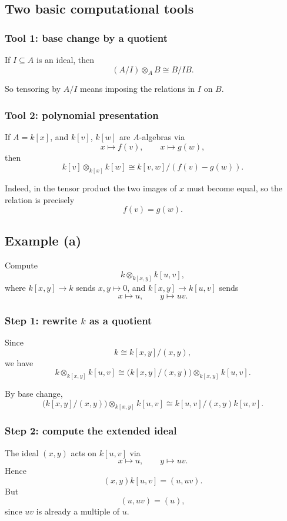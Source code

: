 \documentclass[12pt,a4paper]{article}
\theoremstyle{notespace}
\begin{document}
\subsection{Two basic computational tools}

\subsubsection*{Tool 1: base change by a quotient}

If \(I\subseteq A\) is an ideal, then
\[
(A/I)\otimes_A B \cong B/IB.
\]

So tensoring by \(A/I\) means imposing the relations in \(I\) on \(B\).

\subsubsection*{Tool 2: polynomial presentation}

If \(A=k[x]\), and \(k[v]\), \(k[w]\) are \(A\)-algebras via
\[
x\mapsto f(v),\qquad x\mapsto g(w),
\]
then
\[
k[v]\otimes_{k[x]} k[w]\cong k[v,w]/(f(v)-g(w)).
\]

Indeed, in the tensor product the two images of \(x\) must become equal, so the relation is precisely
\[
f(v)=g(w).
\]

\subsection{Example (a)}

Compute
\[
k\otimes_{k[x,y]} k[u,v],
\]
where \(k[x,y]\to k\) sends \(x,y\mapsto 0\), and \(k[x,y]\to k[u,v]\) sends
\[
x\mapsto u,\qquad y\mapsto uv.
\]

\subsubsection*{Step 1: rewrite \(k\) as a quotient}

Since
\[
k\cong k[x,y]/(x,y),
\]
we have
\[
k\otimes_{k[x,y]} k[u,v]
\cong
\big(k[x,y]/(x,y)\big)\otimes_{k[x,y]} k[u,v].
\]

By base change,
\[
\big(k[x,y]/(x,y)\big)\otimes_{k[x,y]} k[u,v]
\cong
k[u,v]/(x,y)k[u,v].
\]

\subsubsection*{Step 2: compute the extended ideal}

The ideal \((x,y)\) acts on \(k[u,v]\) via
\[
x\mapsto u,\qquad y\mapsto uv.
\]
Hence
\[
(x,y)k[u,v]=(u,uv).
\]
But
\[
(u,uv)=(u),
\]
since \(uv\) is already a multiple of \(u\).
\end{document}
